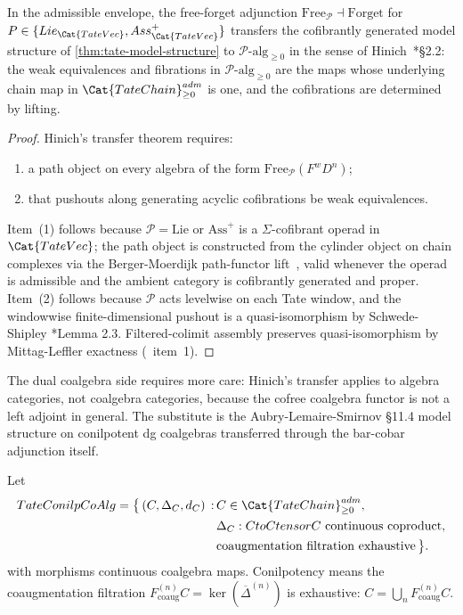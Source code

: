 \begin{lem}
  \label{lem:transferred-model}
  In the admissible envelope, the free-forget adjunction
  $\mathrm{Free}_{\mathcal P}\dashv\mathrm{Forget}$ for
  $\mathcal P\in\{\mathrm{Lie}_{\Cat{TateVec}},
  \mathrm{Ass}^+_{\Cat{TateVec}}\}$ transfers the cofibrantly
  generated model structure of \ref{thm:tate-model-structure} to
  $\mathcal P\text{-alg}_{\geq 0}$ in the sense of
  Hinich~\cite{hinich-htpy-alg}*{\S 2.2}: the weak equivalences and
  fibrations in $\mathcal P\text{-alg}_{\geq 0}$ are the maps
  whose underlying chain map in
  $\Cat{TateChain}_{\geq 0}^{\mathrm{adm}}$ is one,
  and the cofibrations are determined by lifting.
\end{lem}

\begin{proof}
  Hinich's transfer theorem requires:
  \begin{enumerate}[label=(\arabic*)]
    \item a path object on every algebra of the form
      $\mathrm{Free}_{\mathcal P}(F^w D^n)$;
    \item that pushouts along generating acyclic cofibrations be
      weak equivalences.
  \end{enumerate}
  Item~(1) follows because $\mathcal P=\mathrm{Lie}$ or
  $\mathrm{Ass}^+$ is a $\Sigma$-cofibrant operad in
  $\Cat{TateVec}$; the path object is constructed from the
  cylinder object on chain complexes via the Berger-Moerdijk
  path-functor lift~\cite{berger-moerdijk-axiomatic}, valid
  whenever the operad is admissible and the ambient category is
  cofibrantly generated and proper. Item~(2) follows because
  $\mathcal P$ acts levelwise on each Tate window, and the windowwise
  finite-dimensional pushout is a quasi-isomorphism by
  Schwede-Shipley \cite{schwede-shipley-monoid}*{Lemma 2.3}.
  Filtered-colimit assembly preserves quasi-isomorphism by
  Mittag-Leffler exactness (\alpharef\ item~1).
\end{proof}

The dual coalgebra side requires more care: Hinich's transfer
applies to algebra categories, not coalgebra categories, because
the cofree coalgebra functor is not a left adjoint in general.
The substitute is the Aubry-Lemaire-Smirnov \cite{loday-vallette}
\S 11.4 model structure on conilpotent dg coalgebras transferred
through the bar-cobar adjunction itself.

\begin{defn}\label{defn:tate-conilp-coalg}
  Let
  $$\begin{aligned}
  \mathrm{TateConilpCoAlg}
  =\bigl\{\,(C,\Delta_C,d_C)\,:\,&
  C\in\Cat{TateChain}_{\geq 0}^{\mathrm{adm}},\\
  &\Delta_C\colon C\to C\widehat\otimes C
    \text{ continuous coproduct},\\
  &\text{coaugmentation filtration exhaustive}\,\bigr\}.
  \end{aligned}$$
  with morphisms continuous coalgebra maps. Conilpotency means
  the coaugmentation filtration $F^{(n)}_{\mathrm{coaug}}C=
  \ker(\overline\Delta^{(n)})$ is exhaustive: $C=\bigcup_n
  F^{(n)}_{\mathrm{coaug}}C$.
\end{defn}


